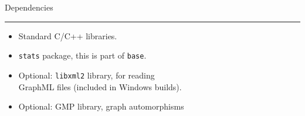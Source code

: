 \documentclass[landscape]{foils}
\newcommand{\stitle}[1]{{\centering\color{blue}\Large #1\par\vspace*{10pt}\hrule}}
\begin{document}
\newpage
\stitle{Dependencies}
\begin{itemize}
\item Standard C/C++ libraries. 
  \marginpar{\vspace*{-1.5cm}}
  \\[-10pt]\pause
\item \texttt{stats} package, this is part of \texttt{base}.
  \marginpar{\vspace*{0.3cm}}
  \\[-10pt]\pause
\item Optional: \texttt{libxml2} library, for reading \\ GraphML files
  (included in Windows builds).
  \marginpar{\vspace*{-2.3cm}}
  \\[-10pt]\pause
\item Optional: GMP library, graph automorphisms\\

\end{itemize}
\end{document}
